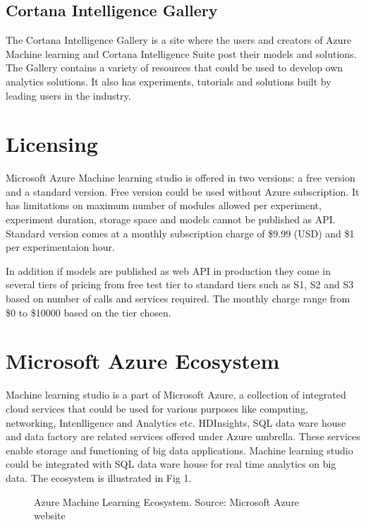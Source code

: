 \documentclass[9pt,twocolumn,twoside]{styles/osajnl}
\begin{document}
\subsection{Cortana Intelligence Gallery}
The Cortana Intelligence Gallery\cite{www-cortanaIntelligenceGallery}
is a site where the users and creators of Azure Machine learning and
Cortana Intelligence Suite post their models and solutions. The
Gallery contains a variety of resources that could be used to develop
own analytics solutions. It also has experiments, tutorials and
solutions built by leading users in the industry.

\section{Licensing}

Microsoft Azure Machine learning studio is offered in two versions: a
free version and a standard version.\cite{www-azureMLPricing} Free
version could be used without Azure subscription. It has limitations
on maximum number of modules allowed per experiment, experiment
duration, storage space and models cannot be published as
API. Standard version comes at a monthly subscription charge of \$9.99
(USD) and \$1 per experimentaion hour.

In addition if models are published as web API in production they come
in several tiers of pricing from free test tier to standard tiers such as
S1, S2 and S3  based on number of calls and services required. The
monthly charge range from \$0 to \$10000 based on the tier chosen.

\section{Microsoft Azure Ecosystem}
Machine learning studio is a part of Microsoft Azure, a collection of
integrated cloud services that could be used for various purposes like
computing, networking, Intenlligence and Analytics etc. HDInsights,
SQL data ware house and data factory are related services offered
under Azure umbrella. These services enable storage and functioning of
big data applications. Machine learning studio could be integrated
with SQL data ware house for real time analytics on big data. The
ecosystem is illustrated in Fig 1.

\begin{figure}[htbp]
\centering
{}
\caption{Azure Machine Learning Ecosystem. \newline Source: Microsoft
  Azure website\cite{www-azureSQLDataWarehouse}}
\label{fig:false-color}
\end{figure}
\end{document}
